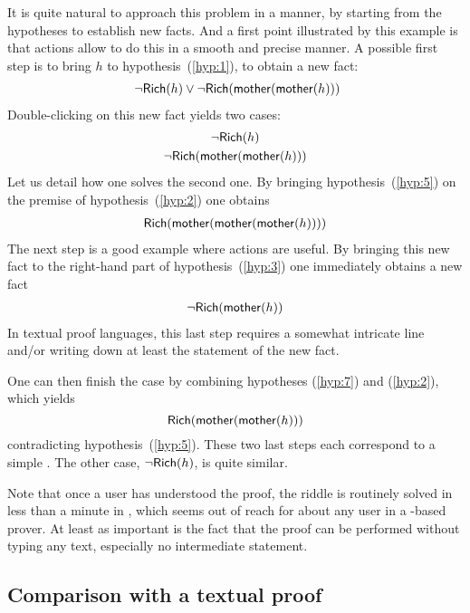 It is quite natural to approach this problem in a  manner, by
starting from the hypotheses to establish new facts. And a first point
illustrated by this example is that  actions allow to do this in a
smooth and precise manner. A possible first step is to bring $h$ to
hypothesis~(\ref{hyp:1}), to obtain a new fact:
\begin{gather}
  ~\neg\mbox{\textsf{Rich}}(h)\lor \neg\mbox{\textsf{Rich}}(\mbox{\textsf{mother}}(\mbox{\textsf{mother}}(h))) \label{hyp:3}
\end{gather}
Double-clicking on this new fact yields two cases:
\begin{gather}
  \neg\mbox{\textsf{Rich}}(h) \label{hyp:4} \\
  \neg\mbox{\textsf{Rich}}(\mbox{\textsf{mother}}(\mbox{\textsf{mother}}(h))) \label{hyp:5}
\end{gather}
Let us detail how one solves the second one. By bringing
hypothesis~(\ref{hyp:5}) on the premise of hypothesis~(\ref{hyp:2}) one obtains
\begin{gather}
  \mbox{\textsf{Rich}}(\mbox{\textsf{mother}}(\mbox{\textsf{mother}}(\mbox{\textsf{mother}}(h)))) \label{hyp:6}
\end{gather}
The next step is a good example where  actions are useful. By bringing
this new fact to the right-hand part of hypothesis~(\ref{hyp:3}) one immediately
obtains a new fact
\begin{gather}
  \neg{\mbox{\textsf{Rich}}(\mbox{\textsf{mother}}(h))} \label{hyp:7}
\end{gather}
In textual proof languages, this last step requires a somewhat intricate
 line and/or writing down at least the statement of the new fact.

One can then finish the case by combining hypotheses (\ref{hyp:7}) and
(\ref{hyp:2}), which yields
$$\mbox{\textsf{Rich}}(\mbox{\textsf{mother}}(\mbox{\textsf{mother}}(h)))$$
contradicting hypothesis~(\ref{hyp:5}). These two last steps each correspond to a
simple . The other case, $\neg\mbox{\textsf{Rich}}(h)$, is quite similar.

Note that once a user has understood the proof, the riddle is routinely solved
in less than a minute in , which seems out of reach for about any user in
a -based prover. At least as important is the fact that the proof can be
performed without typing any text, especially no intermediate statement. 

\subsection{Comparison with a textual proof}

